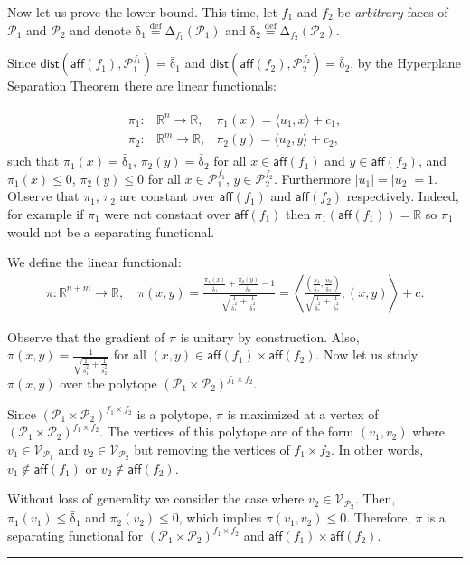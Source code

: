 \documentclass{article}
\newcommand{\R}{\mathbb{R}}
\newcommand{\jmlrBlackBox}{\rule{1.5ex}{1.5ex}}
\newcommand{\jmlrQED}{\hfill\jmlrBlackBox\par\bigskip}
\providecommand{\proofname}{Proof}
\renewenvironment{proof}%
{%
 \par\noindent{\bfseries\upshape \proofname\ }%
}%
{\jmlrQED}
\newcommand{\mP}{\mathcal{P}}
\newcommand{\verts}[1]{\mathcal{V}_{#1}}
\newcommand{\aff}[1]{\mathsf{aff}\left(#1\right)}
\newcommand{\dist}[1]{\mathsf{dist}\left(#1\right)}
\newcommand{\defi}{\stackrel{\mathrm{\scriptscriptstyle def}}{=}}
\newcommand{\what}{\operatorname{\bar{\delta}}}
\newcommand{\whatface}[2]{\operatorname{\bar{\Delta}}_{#1}(#2)}
\begin{document}
\begin{proof}
  Now let us prove the lower bound. This time, let $f_1$ and $f_2$ be \emph{arbitrary} faces of $\mP_1$ and $\mP_2$ and denote $\what_1 \defi \whatface{f_1}{\mP_1}$ and $\what_2 \defi \whatface{f_2}{\mP_2}$.

  Since $\dist{\aff{f_1},\mP_1^{f_1}} = \what_1$ and $\dist{\aff{f_2},\mP_2^{f_2}} = \what_2$, by the Hyperplane Separation Theorem there are linear functionals:

  \begin{align*}
      \begin{aligned}
    \pi_1:&\R^n \to \R, &\pi_1(x) = \langle u_1, x \rangle + c_1,      \\
    \pi_2:&\R^m \to \R, &\pi_2(y) = \langle u_2, y \rangle + c_2,
      \end{aligned}
  \end{align*}
  such that $\pi_1(x) = \what_1$, $\pi_2(y) = \what_2$ for all $x\in \aff{f_1}$ and $y\in \aff{f_2}$, and $\pi_1(x) \leq 0$, $\pi_2(y) \leq 0$ for all $x\in \mP_1^{f_1}$, $y\in \mP_2^{f_2}$. Furthermore $|u_1|=|u_2|=1$. Observe that $\pi_1$, $\pi_2$ are constant over $\aff{f_1}$ and $\aff{f_2}$ respectively. Indeed, for example if $\pi_1$ were not constant over $\aff{f_1}$ then $\pi_1(\aff{f_1})=\R$ so $\pi_1$ would not be a separating functional.

  We define the linear functional:
  \begin{align*}
    \pi: \R^{n+m} \to \R, \quad \pi(x,y) = \frac{\frac{\pi_1(x)}{\what_1}+\frac{\pi_2(y)}{\what_2}-1}{\sqrt{\frac{1}{\what_1^2}+\frac{1}{\what_2^2}}}= \left\langle \frac{\left(\frac{u_1}{\what_1}, \frac{u_2}{\what_2}\right)}{\sqrt{\frac{1}{\what_1^2}+\frac{1}{\what_2^2}}}, (x,y) \right\rangle + c.
  \end{align*}

  Observe that the gradient of $\pi$ is unitary by construction. Also, $\pi(x,y)=\frac{1}{\sqrt{\frac{1}{\what_1^2}+\frac{1}{\what_2^2}}}$ for all $(x,y)\in \aff{f_1}\times \aff{f_2}$. Now let us study $\pi(x,y)$ over the polytope $\left(\mP_1\times \mP_2\right)^{f_1\times f_2}$.

  Since $\left(\mP_1\times \mP_2\right)^{f_1\times f_2}$ is a polytope, $\pi$ is maximized at a vertex of $\left(\mP_1\times \mP_2\right)^{f_1\times f_2}$. The vertices of this polytope are of the form $(v_1,v_2)$ where $v_1\in \verts{\mP_1}$ and $v_2\in \verts{\mP_2}$ but removing the vertices of $f_1\times f_2$. In other words, $v_1\not\in \aff{f_1}$ or $v_2\not\in \aff{f_2}$.

  Without loss of generality we consider the case where $v_2\in \verts{\mP_2}$. Then, $\pi_1(v_1)\leq \what_1$ and $\pi_2(v_2)\leq 0$, which implies $\pi(v_1,v_2)\leq 0$. Therefore, $\pi$ is a separating functional for $\left(\mP_1\times \mP_2\right)^{f_1\times f_2}$ and $\aff{f_1}\times \aff{f_2}$.


\end{proof}
\end{document}

